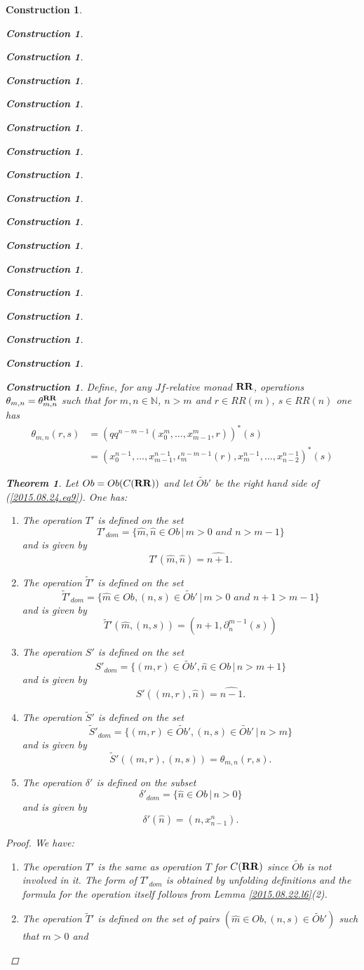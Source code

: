 \documentclass[onecolumn,12pt]{amsart}
\newtheorem{theorem}[proposition]{Theorem}
\numberwithin{proposition}{subsection}
\newtheorem{construction}[proposition]{Construction}
\newcommand{\nn}{{\mathbb N}}
\newcommand{\nat}{\nn}
\newcommand{\wt}{\widetilde}
\newcommand{\wh}{\widehat}
\newcommand{\mbind}[1]{{#1^*}}
\newcommand{\RR}{{\bf RR}}
\begin{document}
\begin{construction}
\begin{construction}
\begin{construction}
\begin{construction}
\begin{construction}
\begin{construction}
\begin{construction}
\begin{construction}
\begin{construction}
\begin{construction}
\begin{construction}
\begin{construction}
\begin{construction}
\begin{construction}
\begin{construction}
\begin{construction}
\begin{construction}
Define, for any $Jf$-relative monad $\RR$, operations
$\theta_{m,n}=\theta^{\RR}_{m,n}$ such that for $m,n\in\nat$, $n>m$ and $r\in
RR(m)$, $s\in RR(n)$ one has
%
\begin{equation}
  \label{2015.09.07.eq1}
  \begin{split}
    \theta_{m,n}(r,s)&=\mbind{(qq^{n-m-1}(x_0^m,\dots,x_{m-1}^m,r))}(s) \\
    &=\mbind{(x_0^{n-1},\dots,x_{m-1}^{n-1},\iota_{m}^{n-m-1}(r),x_m^{n-1},\dots,x_{n-2}^{n-1})}(s)
  \end{split}
\end{equation}%
%
\begin{theorem}
\label{2015.08.26.th1}
Let $Ob=Ob(C(\RR))$ and let $\wt{Ob}'$ be the right hand side of (\ref{2015.08.24.eq9}). One has:
%
\begin{enumerate}
\item The operation $T'$ is defined on the set
%
\[T'_{dom}=\{\wh{m},\wh{n}\in Ob\,|\,m>0\,\,and\,\,n>m-1\}\]
%
and is given by 
%
\[T'(\wh{m},\wh{n})=\wh{n+1}.\]
%
\item The operation $\wt{T}'$ is defined on the set 
%
\[\wt{T}'_{dom}=\{\wh{m}\in Ob, (n,s)\in \wt{Ob}'\,|\,m>0\,\,and\,\,n+1>m-1\}\]
%
and is given by
%
\[\wt{T}'(\wh{m},(n,s))=(n+1,\partial_n^{m-1}(s))\]
%
\item The operation $S'$ is defined on the set
%
\[S'_{dom}=\{(m,r)\in \wt{Ob}',\wh{n}\in Ob\,|\,n>m+1\}\]
%
and is given by
%
\[S'((m,r),\wh{n})=\wh{n-1}.\]
%
\item The operation $\wt{S}'$ is defined on the set 
%
\[\wt{S}'_{dom}=\{(m,r)\in\wt{Ob}',(n,s)\in \wt{Ob}'\,|\,n>m\}\]
%
and is given by
%
\[\wt{S}'((m,r),(n,s))=\theta_{m,n}(r,s).\]
%
\item The operation $\delta'$ is defined on the subset
%
\[\delta'_{dom}=\{\wh{n}\in Ob\,|\,n>0\}\]
%
and is given by
%
\[\delta'(\wh{n})=(n,x_{n-1}^n).\]
%
\end{enumerate}
\end{theorem}
%
\begin{proof}
We have:
%
\begin{enumerate}
%
\item The operation $T'$ is the same as operation $T$ for $C(\RR)$ since $\wt{Ob}$
  is not involved in it. The form of $T'_{dom}$ is obtained by unfolding
  definitions and the formula for the operation itself follows from Lemma
  \ref{2015.08.22.l6}(2).
%
\item The operation $\wt{T}'$ is defined on the set of pairs $(\wh{m}\in Ob,
  (n,s)\in \wt{Ob}')$ such that $m>0$ and

\end{enumerate}
\end{proof}
\end{construction}
\end{construction}
\end{construction}
\end{construction}
\end{construction}
\end{construction}
\end{construction}
\end{construction}
\end{construction}
\end{construction}
\end{construction}
\end{construction}
\end{construction}
\end{construction}
\end{construction}
\end{construction}
\end{construction}
\end{document}

